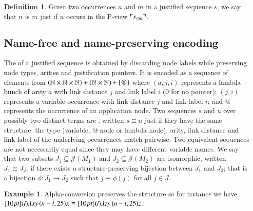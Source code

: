 \documentclass{elsarticle}
\theoremstyle{plain}
\theoremstyle{definition}
\newtheorem{definition}{Definition}[section]
\newtheorem{example}{Example}[section]
\def\structisomorphic{\cong} %
\def\justseqset{\mathcal{J}}
\begin{document}
\begin{definition}
\fi
Given two occurrences $n$ and $m$ in a justified sequence $s$, we say that $n$ is  $m$ just if $n$ occurs in the P-view $\ulcorner s_{\leq m} \urcorner$.
\end{definition}

\subsection{Name-free and name-preserving encoding}
The  of a justified sequence is obtained by discarding node labels while preserving node types, arities and justification pointers. It is encoded as a sequence of elements from
$(\mathbb{N}\times\mathbb{N}\times\mathbb{N}) +
   (\mathbb{N}\times\mathbb{N})
   + \{ @ \}$
where $(a, j, i)$ represents a lambda bunch of arity $a$
with link distance $j$ and link label $i$ ($0$ for no pointer);
$(j, i)$ represents a variable occurrence
with link distance $j$ and link label $i$;
and $@$ represents the occurrence of an application node.
%
Two sequences $s$ and $u$ over possibly two distinct terms are , written $s \equiv u$ just if they have the same structure: the type (variable, @-node or lambda node), arity, link distance and link label of the underlying occurrences match pairwise. Two equivalent sequences are not necessarily equal since they may have different variable names.
We say that two subsets $J_1\subseteq \justseqset(M_1)$ and $J_2\subseteq\justseqset(M_2)$ are isomorphic, written $J_1\structisomorphic J_2$, if  there exists a structure-preserving bijection between $J_1$ and $J_2$; that is a bijection $\phi :J_1\longrightarrow J_2$ such that $j\equiv\phi(j)$ for all $j\in J$.

\begin{example}
    Alpha-conversion preserves the structure so for instance we have
    $\Pstr[10pt]{ (l){\lambda x y} \, (n-l,25){x} } \equiv \Pstr[10pt]{ (l){\lambda z y} \, (n-l,25){z}}$.
\end{example}
\end{document}
